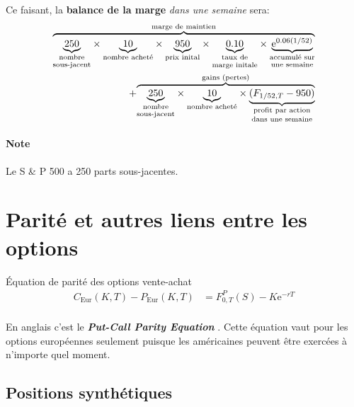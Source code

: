 \documentclass[10pt, french]{article}
\begin{document}
\begin{multicols*}{2}
\begin{algo2}[Exemple]
Ce faisant, la \colorbox{bleudefrance}{\textbf{balance de la marge}} \textit{dans une semaine} sera:
\setlength{\mathindent}{-1cm}
\begin{align*}
	\overset{\text{marge de maintien}}{\overbrace{
		\underset{\text{\shortstack{nombre\\ sous-jacent}}}{\underbrace{250}} \times
		\underset{\text{nombre acheté}}{\underbrace{10}} \times 
		\underset{\text{prix inital}}{\underbrace{950}} \times 
		\underset{\text{\shortstack{taux de\\ marge initale}}}{\underbrace{0.10}} \times 
		\underset{\text{\shortstack{accumulé sur\\ une semaine}}}{\underbrace{\textrm{e}^{0.06 (1/52)}}} 
		}} \\ 
		+ 
	\overset{\text{gains (pertes)}}{\overbrace{
		\underset{\text{\shortstack[c]{nombre\\ sous-jacent}}}{\underbrace{250}} \times
		\underset{\text{nombre acheté}}{\underbrace{10}} \times 
		\underset{\text{\shortstack[c]{profit par action\\ dans une semaine}}}{\underbrace{(F_{1/52, T} -  950)}}
		}}
\end{align*}
\setlength{\mathindent}{1cm}
\end{algo2}

\paragraph*{Note}	Le S \& P 500 a 250 parts sous-jacentes.

\newpage

\setcounter{section}{8}
\section{Parité et autres liens entre les options}
\begin{rappel}{Équation de parité des options vente-achat}
\begin{align*}
	C_{\text{Eur}}(K, T) - P_{\text{Eur}}(K, T)
	&=	F_{0, T}^{P}(S) - K\textrm{e}^{-rT}\\
\end{align*}

En anglais c'est le \og \textit{\textbf{Put-Call Parity Equation}} \fg{}. Cette équation vaut pour les options européennes seulement puisque les américaines peuvent être exercées à n'importe quel moment.
\end{rappel}

\subsection{Positions synthétiques}


\end{multicols*}
\end{document}
